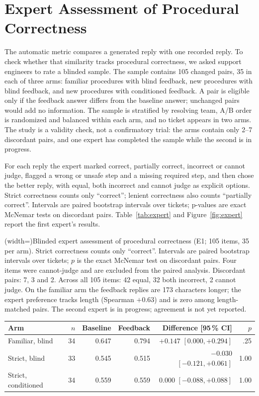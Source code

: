 \section{Expert Assessment of Procedural Correctness}
\label{sec:expert}

The automatic metric compares a generated reply with one recorded reply. To check
whether that similarity tracks procedural correctness, we asked support engineers
to rate a blinded sample. The sample contains 105 changed pairs, 35 in each of
three arms: familiar procedures with blind feedback, new procedures with blind
feedback, and new procedures with conditioned feedback. A pair is eligible only if
the feedback answer differs from the baseline answer; unchanged pairs would add no
information. The sample is stratified by resolving team, A/B order is randomized
and balanced within each arm, and no ticket appears in two arms. The study is a
validity check, not a confirmatory trial: the arms contain only 2--7 discordant
pairs, and one expert has completed the sample while the second is in progress.

For each reply the expert marked correct, partially correct, incorrect or cannot
judge, flagged a wrong or unsafe step and a missing required step, and then chose
the better reply, with equal, both incorrect and cannot judge as explicit options.
Strict correctness counts only ``correct''; lenient correctness also counts
``partially correct''. Intervals are paired bootstrap intervals over tickets;
p-values are exact McNemar tests on discordant pairs. Table~\ref{tab:expert} and
Figure~\ref{fig:expert} report the first expert's results.

\Table[!btp](width=\textwidth){Blinded expert assessment of procedural correctness
(E1; 105 items, 35 per arm). Strict correctness counts only ``correct''. Intervals
are paired bootstrap intervals over tickets; $p$ is the exact McNemar test on
discordant pairs. Four items were cannot-judge and are excluded from the paired
analysis. Discordant pairs: 7, 3 and 2. Across all 105 items: 42 equal, 32 both
incorrect, 2 cannot judge. On the familiar arm the feedback replies are 173
characters longer; the expert preference tracks length (Spearman $+0.63$) and is
zero among length-matched pairs. The second expert is in progress; agreement is not
yet reported.\label{tab:expert}}{
\begin{tabular}{@{}lrrrrr@{}}
\toprule
Arm & $n$ & Baseline & Feedback & Difference [95\,\% CI] & $p$ \\
\midrule
Familiar, blind       & 34 & 0.647 & 0.794 & $+0.147$ $[0.000, +0.294]$ & .25 \\
Strict, blind         & 33 & 0.545 & 0.515 & $-0.030$ $[-0.121, +0.061]$ & 1.00 \\
Strict, conditioned   & 34 & 0.559 & 0.559 & $0.000$ $[-0.088, +0.088]$ & 1.00 \\
\bottomrule
\end{tabular}}

